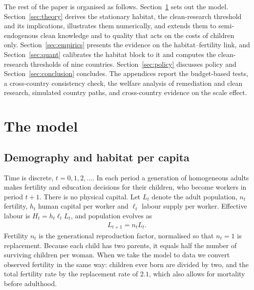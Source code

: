 \documentclass[11pt]{article}
\begin{document}
The rest of the paper is organised as follows. Section~\ref{sec:model} sets out the model.
Section~\ref{sec:theory} derives the stationary habitat, the clean-research threshold and its
implications, illustrates them numerically, and extends them to semi-endogenous clean knowledge and to
quality that acts on the costs of children only. Section~\ref{sec:empirics} presents the evidence on the
habitat--fertility link, and Section~\ref{sec:quant} calibrates the habitat block to it and computes the
clean-research thresholds of nine countries. Section~\ref{sec:policy} discusses policy and
Section~\ref{sec:conclusion} concludes. The appendices report the budget-based tests, a cross-country
consistency check, the welfare analysis of remediation and clean research, simulated country paths, and
cross-country evidence on the scale effect.



\section{The model}
\label{sec:model}
\label{sec:habitat_taste}

\subsection{Demography and habitat per capita}
Time is discrete, $t=0,1,2,\dots$. In each period a generation of homogeneous adults makes fertility
and education decisions for their children, who become workers in period $t+1$. There is no physical
capital. Let $L_t$ denote the adult population, $n_t$ fertility, $h_t$ human capital per worker and
$\ell_t$ labour supply per worker. Effective labour is $H_t=h_t\ell_tL_t$, and population evolves as
\begin{align}
L_{t+1}=n_tL_t .
\label{eq:Llaw_hab}
\end{align}
Fertility $n_t$ is the generational reproduction factor, normalised so that $n_t=1$ is replacement.
Because each child has two parents, it equals half the number of surviving children per woman. When we
take the model to data we convert observed fertility in the same way: children ever born are divided by
two, and the total fertility rate by the replacement rate of $2.1$, which also allows for mortality
before adulthood.
\end{document}
